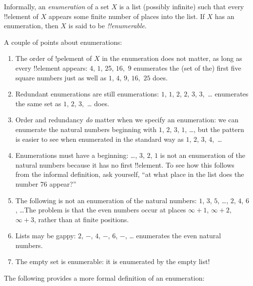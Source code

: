 \documentclass[../../include/open-logic-section]{subfiles}
\begin{document}


\begin{defn}
Informally, an \emph{enumeration} of a set $X$ is a list (possibly
infinite) such that every !!{element} of $X$ appears some finite number of
places into the list. If $X$ has an enumeration, then $X$ is said to
be \emph{!!{enumerable}}.
\end{defn}

\begin{explain}
A couple of points about enumerations:

\begin{enumerate}
\item The order of !p{element} of $X$ in the enumeration does not
  matter, as long as every !!{element} appears: $4$, $1$, $2$5,
  $16$,~$9$ enumerates the (set of the) first five square numbers just
  as well as $1$, $4$, $9$, $16$,~$25$ does.
\item Redundant enumerations are still enumerations: $1$, $1$, $2$,
  $2$, $3$, $3$,~\dots{} enumerates the same set as $1$, $2$,
  $3$,~\dots{} does.
\item Order and redundancy \emph{do} matter when we specify an
  enumeration: we can enumerate the natural numbers beginning with
  $1$, $2$, $3$, $1$, \dots{}, but the pattern is easier to see when
  enumerated in the standard way as $1$, $2$, $3$, $4$,~\dots
\item Enumerations must have a beginning: \dots, $3$, $2$, $1$ is not
  an enumeration of the natural numbers because it has no first
  !!{element}. To see how this follows from the informal definition,
  ask yourself, ``at what place in the list does the number 76
  appear?''
\item The following is not an enumeration of the natural numbers: $1$,
  $3$, $5$, \dots, $2$, $4$, $6$, \dots\@ The problem is that the even
  numbers occur at places $\infty + 1$, $\infty + 2$, $\infty + 3$,
  rather than at finite positions.
\item Lists may be gappy: $2$, $-$, $4$, $-$, $6$, $-$, \dots{}
  enumerates the even natural numbers.
\item The empty set is enumerable: it is enumerated by the empty list!
\end{enumerate}
\end{explain}

The following provides a more formal definition of an 
enumeration:
\end{document}
